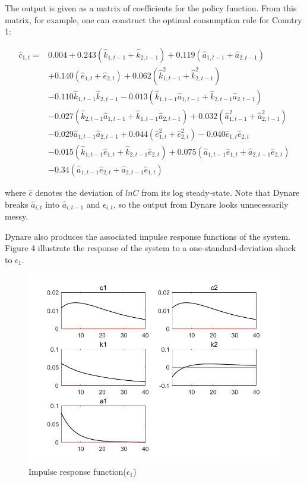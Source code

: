 \documentclass[a4paper,12pt]{scrartcl} %
\begin{document}
The output is given as a matrix of coefficients for the policy function. From this matrix, for example, one can construct the optimal consumption rule for Country 1:

\begin{equation}\nonumber
\begin{split}
\hat{c}_{1,t}=&0.004+0.243(\hat{k}_{1,t-1}+\hat{k}_{2,t-1})+0.119(\hat{a}_{1,t-1}+\hat{a}_{2,t-1})\\
             &+0.140(\hat{e}_{1,t}+\hat{e}_{2,t})+0.062(\hat{k}_{1,t-1}^2+\hat{k}_{2,t-1}^2)\\
             &-0.110\hat{k}_{1,t-1}\hat{k}_{2,t-1}-0.013(\hat{k}_{1,t-1}\hat{a}_{1,t-1}+\hat{k}_{2,t-1}\hat{a}_{2,t-1})\\
            &- 0.027(\hat{k}_{2,t-1}\hat{a}_{1,t-1}+\hat{k}_{1,t-1}\hat{a}_{2,t-1})+0.032(\hat{a}_{1,t-1}^2+\hat{a}_{2,t-1}^2)\\
             &-0.029\hat{a}_{1,t-1}\hat{a}_{2,t-1}+0.044(\hat{e}_{1,t}^2+\hat{e}_{2,t}^2)-0.040\hat{e}_{1,t}\hat{e}_{2,t}\\
            & -0.015(\hat{k}_{1,t-1}\hat{e}_{1,t}+\hat{k}_{2,t-1}\hat{e}_{2,t})+0.075(\hat{a}_{1,t-1}\hat{e}_{1,t}+\hat{a}_{2,t-1}\hat{e}_{2,t})\\
            &-0.34(\hat{a}_{1,t-1}\hat{e}_{2,t}+\hat{a}_{2,t-1}\hat{e}_{1,t})
\end{split}
\end{equation}

where $\hat{c}$ denotes the deviation of $lnC$ from its log steady-state. Note that Dynare breaks $\hat{a}_{i,t}$ into $\hat{a}_{i,t-1}$ and $\epsilon_{i,t}$, so the output from Dynare looks unnecessarily messy.

Dynare also produces the associated impulse response functions of the system. Figure 4 illustrate the response of the system to a one-standard-deviation shock to $\epsilon_1$.

\begin{figure}[htbp!]
		\centering
			\includegraphics[width=0.8\linewidth]{fig4.jpg}
            \caption{Impulse response function($\epsilon_1$)}\label{4}
\end{figure}
\end{document}
